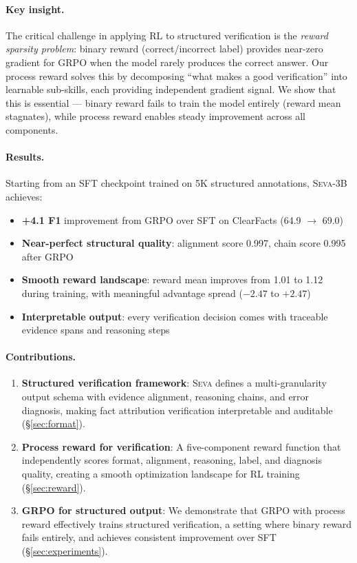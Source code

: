 \documentclass{article}
\newcommand{\seva}{\textsc{Seva}}
\begin{document}
\paragraph{Key insight.}
The critical challenge in applying RL to structured verification is the \emph{reward sparsity problem}: binary reward (correct/incorrect label) provides near-zero gradient for GRPO when the model rarely produces the correct answer.
Our process reward solves this by decomposing ``what makes a good verification'' into learnable sub-skills, each providing independent gradient signal.
We show that this is essential --- binary reward fails to train the model entirely (reward mean stagnates), while process reward enables steady improvement across all components.

\paragraph{Results.}
Starting from an SFT checkpoint trained on 5K structured annotations, \seva{}-3B achieves:
\begin{itemize}[nosep,leftmargin=*]
  \item \textbf{+4.1 F1} improvement from GRPO over SFT on ClearFacts (64.9 $\to$ 69.0)
  \item \textbf{Near-perfect structural quality}: alignment score 0.997, chain score 0.995 after GRPO
  \item \textbf{Smooth reward landscape}: reward mean improves from 1.01 to 1.12 during training, with meaningful advantage spread ($-2.47$ to $+2.47$)
  \item \textbf{Interpretable output}: every verification decision comes with traceable evidence spans and reasoning steps
\end{itemize}

\paragraph{Contributions.}
\begin{enumerate}[nosep,leftmargin=*]
  \item \textbf{Structured verification framework}: \seva{} defines a multi-granularity output schema with evidence alignment, reasoning chains, and error diagnosis, making fact attribution verification interpretable and auditable (\S\ref{sec:format}).
  \item \textbf{Process reward for verification}: A five-component reward function that independently scores format, alignment, reasoning, label, and diagnosis quality, creating a smooth optimization landscape for RL training (\S\ref{sec:reward}).
  \item \textbf{GRPO for structured output}: We demonstrate that GRPO with process reward effectively trains structured verification, a setting where binary reward fails entirely, and achieves consistent improvement over SFT (\S\ref{sec:experiments}).
\end{enumerate}
\end{document}
